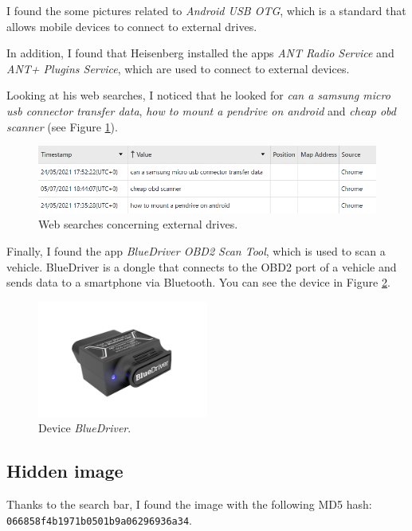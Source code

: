 \documentclass[12pt]{article}
\begin{document}
I found the some pictures related to \textit{Android USB OTG}, which is a standard that allows mobile devices to connect to external drives.

In addition, I found that Heisenberg installed the apps \textit{ANT Radio Service} and \textit{ANT+ Plugins Service}, which are used to connect to external devices.

Looking at his web searches, I noticed that he looked for \textit{can a samsung micro usb connector transfer data}, \textit{how to mount a pendrive on android} and \textit{cheap obd scanner} (see Figure \ref{fig:web}).

\begin{figure}[!ht]
    \centering
    \includegraphics[width=\textwidth]{images/web-searches.png}
    \caption{Web searches concerning external drives.}
    \label{fig:web}
\end{figure}

Finally, I found the app \textit{BlueDriver OBD2 Scan Tool}, which is used to scan a vehicle. BlueDriver is a dongle that connects to the OBD2 port of a vehicle and sends data to a smartphone via Bluetooth. You can see the device in Figure \ref{fig:bluedriver}.

\begin{figure}[!ht]
    \centering
    \includegraphics[width=0.5\textwidth]{images/bluedriver.png}
    \caption{Device \textit{BlueDriver}.}
    \label{fig:bluedriver}
\end{figure}

\subsection{Hidden image}

Thanks to the search bar, I found the image with the following MD5 hash: \\
\texttt{066858f4b1971b0501b9a06296936a34}. 
\end{document}
